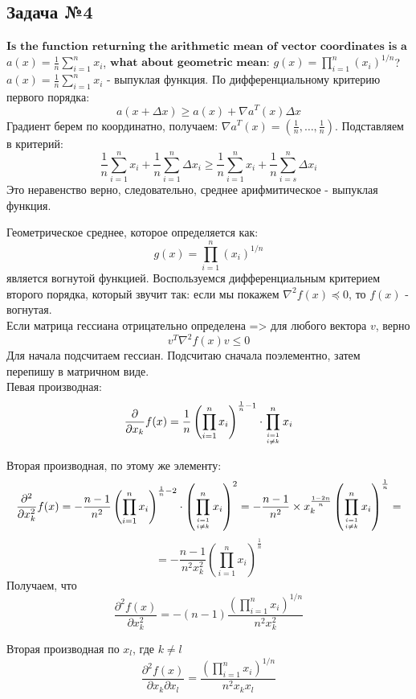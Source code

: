 \documentclass[12pt,letterpaper]{article}
\begin{document}
\subsection*{Задача №4}
$\textbf{Is the function returning the arithmetic mean of vector coordinates is a convex one:}$ $a(x) = \frac{1}{n}\sum\limits_{i=1}^n x_i$, $\textbf{what about geometric mean:}$ $g(x) = \prod\limits_{i=1}^n \left(x_i \right)^{1/n}$?\\

$a(x) = \frac{1}{n}\sum\limits_{i=1}^n x_i$ - выпуклая функция. По дифференциальному критерию первого порядка:
$$ a(x+\Delta x) \geq a(x)+\nabla a^{T}(x) \Delta x $$
Градиент берем по координатно, получаем: $ \nabla a^{T}(x) = \left( \frac{1}{n}, \ldots, \frac{1}{n} \right) $. Подставляем в критерий: 
$$ \frac{1}{n} \sum_{i=1}^{n} x_{i}+\frac{1}{n} \sum_{i=1}^{n} \Delta x_{i} \geq \frac{1}{n} \sum_{i=1}^{n} x_{i}+\frac{1}{n} \sum_{i=s}^{n} \Delta x_{i} $$
Это неравенство верно, следовательно, среднее арифмитическое - выпуклая функция.

Геометрическое среднее, которое определяется как: 
$$ g(x)=\prod_{i=1}^{n}\left(x_{i}\right)^{1 / n} $$
является вогнутой функцией. Воспользуемся дифференциальным критерием второго порядка, который звучит так: если мы покажем $\nabla^{2} f(x) \preceq 0 $, то $f(x)$ - вогнутая.\\
Если матрица гессиана отрицательно определена => для любого вектора $ v $, верно 
$$ v^{T} \nabla^{2} f(x) v \leqslant 0 $$
Для начала подсчитаем гессиан. Подсчитаю сначала поэлементно, затем перепишу в матричном виде.\\
Певая производная: 
$$ \frac{\partial}{\partial x_{k}} f(x)=\frac{1}{n}\left(\prod_{i=1}^{n} x_{i}\right)^{\frac{1}{n}-1} \cdot \prod_{i=1 \atop i \neq k}^{n} x_{i} $$

Вторая производная, по этому же элементу: 
$$ \frac{\partial^{2}}{\partial x_{k}^{2}} f(x)=-\frac{n-1}{n^{2}}\left(\prod_{i=1}^{n} x_{i}\right)^{\frac{1}{n}-2} \cdot\left(\prod_{i=1 \atop i \neq k}^{n} x_{i}\right)^{2}=-\frac{n-1}{n^{2}} \times x_k^{\frac{1-2 n}{n}}\left(\prod_{i=1 \atop i \neq k}^{n} x_{i}\right)^{\frac{1}{n}}=  $$
$$= -\frac{n-1}{n^{2} x_{k}^{2}}\left(\prod_{i=1}^{n} x_{i}\right)^{\frac{1}{n}} $$
Получаем, что 
$$ \frac{\partial^{2} f(x)}{\partial x_{k}^{2}}=-(n-1) \frac{\left(\prod_{i=1}^{n} x_{i}\right)^{1 / n}}{n^{2} x_{k}^{2}} $$

Вторая производная по $x_l$, где $ k \neq l $
$$ \frac{\partial^{2} f(x)}{\partial x_{k} \partial x_{l}}=\frac{\left(\prod_{i=1}^{n} x_{i}\right)^{1 / n}}{n^{2} x_{k} x_{l}} $$
\end{document}

